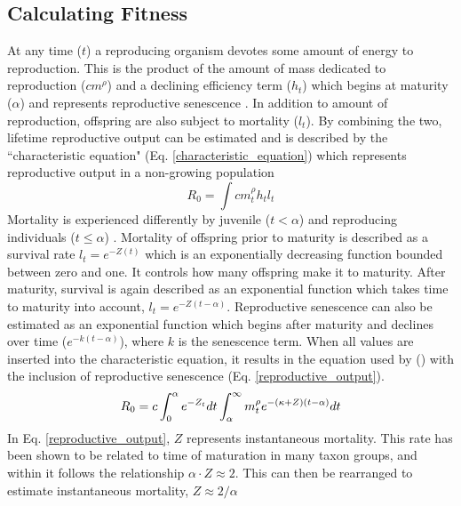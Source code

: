 \documentclass[a4paper, 11pt, hidelinks]{article} %
\begin{document}
	\subsection{Calculating Fitness}
	At any time ($ t $) a reproducing organism devotes some amount of energy to reproduction.  This is the product of the amount of mass dedicated to reproduction ($ cm^\rho $) and a declining efficiency term ($ h_t $) which begins at maturity ($ \alpha $) and represents reproductive senescence \parencite{Benoit2018, Vrtilek2018, Stearns2000}.  In addition to amount of reproduction, offspring are also subject to mortality ($ l_t $).  By combining the two, lifetime reproductive output can be estimated and is described by the ``characteristic equation" (Eq. \ref{characteristic_equation}) which represents reproductive output in a non-growing population \parencite{Tsoukali2016, roff1993, Roff2001, stearns1992evolution, Arendt2011, Roff1986, Roff1984}
	\begin{equation}
		\label{characteristic_equation}
		R_0 = \int c m_t^\rho h_t l_t 
	\end{equation}
	Mortality is experienced differently by juvenile ($ t < \alpha $) and reproducing individuals ($ t \leq \alpha $) \parencite{Day2018}. 
	Mortality of offspring prior to maturity is described as a survival rate $ l_t = e^{-Z(t)} $ which is an exponentially decreasing function bounded between zero and one.  It controls how many offspring make it to maturity.  After maturity, survival is again described as an exponential function which takes time to maturity into account, $ l_t = e^{-Z(t-\alpha)} $.  
	Reproductive senescence can also be estimated as an exponential function which begins after maturity and declines over time  ($ e^{-k(t-\alpha)} $), where $ k $ is the senescence term.  When all values are inserted into the characteristic equation, it results in the equation used by \citeauthor{Charnov2001} (\citeyear{Charnov2001}) with the inclusion of reproductive senescence (Eq. \ref{reproductive_output}).
	\begin{equation}
		\label{reproductive_output}
		R_0 = c\int_0^\alpha e^{-Z_t} dt  \int_\alpha^\infty m_t^\rho e^{-(\kappa + Z)(t - \alpha)}dt\\
	\end{equation} 
	In Eq. \ref{reproductive_output}, $ Z $ represents instantaneous mortality.  This rate has been shown to be related to time of maturation in many taxon groups, and within it follows the relationship $ \alpha \cdot Z \approx  2$.  This can then be rearranged to estimate instantaneous mortality, $ Z \approx 2/\alpha  $
	
\end{document}
